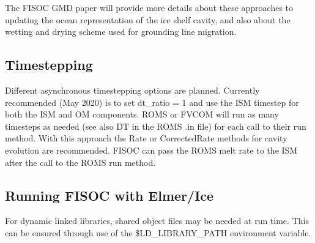 \documentclass[11pt]{article}
\begin{document}
The FISOC GMD paper will provide more  details about these approaches 
to updating the ocean 
representation of the ice shelf cavity, and also about the wetting and 
drying scheme used for grounding line migration.












\subsection{Timestepping}

Different asynchronous timestepping options are planned.
Currently recommended (May 2020) is to set dt\_ratio = 1 and use the 
ISM timestep for both the ISM and OM components. 
ROMS or FVCOM will run as many timesteps as needed  (see also  DT in the ROMS .in file) 
for each call to their run method. 
With this approach the Rate or CorrectedRate methods for cavity evolution 
are recommended. 
FISOC can pass the ROMS melt rate to the ISM after the call to the 
ROMS run method. 








\subsection{Running FISOC with Elmer/Ice} 
For dynamic linked libraries, shared object files may be needed at run time.  
This can be ensured through use of 
the \$LD\_LIBRARY\_PATH environment variable. 
\end{document}
